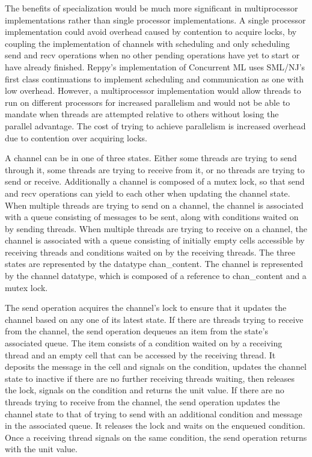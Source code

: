 \documentclass{article}
\begin{document}
The benefits of specialization would be much more significant in multiprocessor
implementations rather than single processor implementations.  A single processor
implementation could avoid overhead caused by contention to acquire locks, by coupling the
implementation of channels with scheduling and only scheduling send and recv operations when no
other pending operations have yet to start or have already finished.  Reppy's implementation of
Concurrent ML uses SML/NJ's first class continuations to implement scheduling and communication
as one with low overhead.  However, a multiprocessor implementation would allow threads to run
on different processors for increased parallelism and would not be able to mandate when threads
are attempted relative to others without losing the parallel advantage.  The cost of trying to
achieve parallelism is increased overhead due to contention over acquiring locks.

A channel can be in one of three states.  Either some threads are trying to send through it,
some threads are trying to receive from it, or no threads are trying to send or receive.
Additionally a channel is composed of a mutex lock, so that send and recv operations can yield
to each other when updating the channel state.  When multiple threads are trying to send on a
channel, the channel is associated with a queue consisting of messages to be sent, along with
conditions waited on by sending threads. When multiple threads are trying to receive on a
channel, the channel is associated with a queue consisting of initially empty cells accessible
by receiving threads and conditions waited on by the receiving threads. The three states are
represented by the datatype chan\_content.  The channel is represented by the channel datatype,
which is composed of a reference to chan\_content and a mutex lock.  

The send operation acquires the channel's lock to ensure that it updates the channel based on
any one of its latest state.  If there are threads trying to receive from the channel, the send
operation dequeues an item from the state's associated queue.  The item consists of a condition
waited on by a receiving thread and an empty cell that can be accessed by the receiving thread.
It deposits the message in the cell and signals on the condition, updates the channel state to
inactive if there are no further receiving threads waiting, then releases the lock, signals on
the condition and returns the unit value.  If there are no threads trying to receive from the
channel, the send operation updates the channel state to that of trying to send with an
additional condition and message in the associated queue.  It releases the lock and waits on
the enqueued condition.  Once a receiving thread signals on the same condition, the send
operation returns with the unit value.
\end{document}
